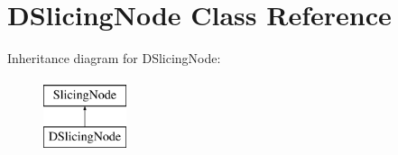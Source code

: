 \hypertarget{class_open_chams_1_1_d_slicing_node}{\section{D\-Slicing\-Node Class Reference}
\label{class_open_chams_1_1_d_slicing_node}
}
Inheritance diagram for D\-Slicing\-Node\-:\begin{figure}[H]
\begin{center}
\leavevmode
\includegraphics[height=2.000000cm]{class_open_chams_1_1_d_slicing_node}
\end{center}
\end{figure}
